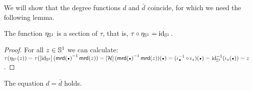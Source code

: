 \documentclass[english,a4]{article}
\renewcommand{\ap}[1]{\left[{#1}\right]}
\begin{document}
We will show that the degree functions $d$ and $\bar d$ coincide, 
for which we need the following lemma.
\begin{lemma}
The function $\eta_{{{\mathbb S^{1}}}}$ is a section of $\tau$, that is, $\tau\circ\eta_{{{\mathbb S^{1}}}} = \mathord{\mathrm{id}}_{{{\mathbb S^{1}}}}$.
\label{lem:eta-S1-section-tau}
\end{lemma}
\begin{proof} For all $z\in{{\mathbb S^{1}}}$ we can calculate:
$\tau(\eta_{\Sc}(z)) = 
\tau(\ap{\id_{\Sp}}(\inv{\mrd(\base)} \mrd(z)) = 
\ap{\hopf}(\inv{\mrd(\base)} \mrd(z))(\base) = 
(\iota_{\base}^{-1} \circ \iota_z) (\base) =
\id_{\Sc}^{-1}(\iota_z (\base)) = z$.
\end{proof}


\begin{proposition}
  The equation $d=\bar d$ holds.
  \label{prop:alternative-description-degree}
\end{proposition}
\end{document}
